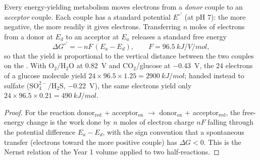 \begin{theorem}\label{thm:b2:microbial-metabolism:redox}
Every energy-yielding metabolism moves electrons from a
\emph{donor} couple to an \emph{acceptor} couple. Each couple has a
standard potential $E^{\circ\prime}$ (at pH 7): the more negative,
the more readily it gives electrons. Transferring $n$ moles of
electrons from a donor at $E_d$ to an acceptor at $E_a$ releases a
standard free energy
\[
\Delta G^{\circ\prime} = -\,n F\,(E_a - E_d), \qquad F = \qty{96.5}{kJ/V/mol},
\]
so that the yield is proportional to the vertical distance between
the two couples on the \emph{}. With
$\mathrm{O_2/H_2O}$ at \qty{+0.82}{V} and $\mathrm{CO_2}$/glucose at
\qty{-0.43}{V}, the 24 electrons of a glucose molecule yield
$24\times 96.5\times 1.25 = \qty{2900}{kJ/mol}$; handed instead to
sulfate ($\mathrm{SO_4^{2-}/H_2S}$, \qty{-0.22}{V}), the same
electrons yield only $24\times 96.5\times 0.21 = \qty{490}{kJ/mol}$.
\end{theorem}
\begin{proof}
For the reaction donor$_{\text{red}}$ + acceptor$_{\text{ox}}$
$\to$ donor$_{\text{ox}}$ + acceptor$_{\text{red}}$, the free-energy
change is the work done by $n$ moles of electron charge $nF$
falling through the potential difference $E_a - E_d$, with the sign
convention that a spontaneous transfer (electrons toward the more
positive couple) has $\Delta G < 0$. This is the Nernst relation of
the Year 1 volume applied to two half-reactions.
\end{proof}


